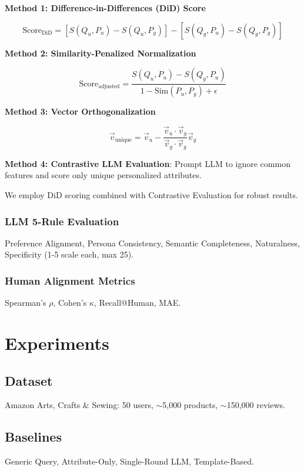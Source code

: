 \documentclass[11pt]{article}
\begin{document}
\textbf{Method 1: Difference-in-Differences (DiD) Score}

$$\text{Score}_{\text{DiD}} = [S(Q_u, P_u) - S(Q_u, P_g)] - [S(Q_g, P_u) - S(Q_g, P_g)]$$

\textbf{Method 2: Similarity-Penalized Normalization}

$$\text{Score}_{\text{adjusted}} = \frac{S(Q_u, P_u) - S(Q_g, P_u)}{1 - \text{Sim}(P_u, P_g) + \epsilon}$$

\textbf{Method 3: Vector Orthogonalization}

$$\vec{v}_{\text{unique}} = \vec{v}_u - \frac{\vec{v}_u \cdot \vec{v}_g}{\vec{v}_g \cdot \vec{v}_g} \vec{v}_g$$

\textbf{Method 4: Contrastive LLM Evaluation}: Prompt LLM to ignore common features and score only unique personalized attributes.

We employ DiD scoring combined with Contrastive Evaluation for robust results.

\subsubsection{LLM 5-Rule Evaluation}

Preference Alignment, Persona Consistency, Semantic Completeness, Naturalness, Specificity (1-5 scale each, max 25).

\subsubsection{Human Alignment Metrics}

Spearman's $\rho$, Cohen's $\kappa$, Recall@Human, MAE.

\section{Experiments}

\subsection{Dataset}

Amazon Arts, Crafts \& Sewing: 50 users, $\sim$5,000 products, $\sim$150,000 reviews.

\subsection{Baselines}

Generic Query, Attribute-Only, Single-Round LLM, Template-Based.
\end{document}
